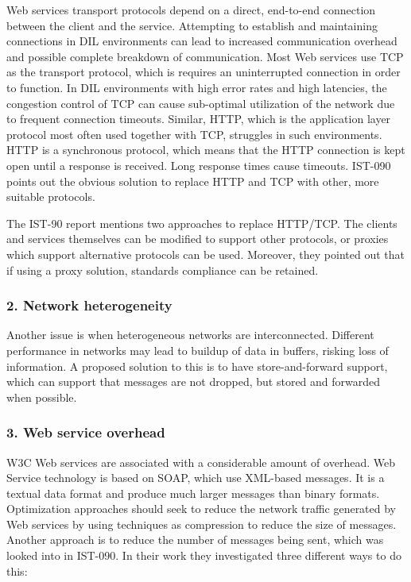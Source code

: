 Web services transport protocols depend on a direct, end-to-end connection
between the client and the service. Attempting to establish and maintaining
connections in DIL environments can lead to increased communication overhead and
possible complete breakdown of communication. Most Web services use TCP as the
transport protocol, which is requires an uninterrupted connection in order to
function. In DIL environments with high error rates and high latencies, the
congestion control of TCP can cause sub-optimal utilization of the network due
to frequent connection timeouts. Similar, HTTP, which is the application layer
protocol most often used together with TCP, struggles in such environments. HTTP
is a synchronous protocol, which means that the HTTP connection is kept open
until a response is received. Long response times cause timeouts. IST-090 points
out the obvious solution to replace HTTP and TCP with other, more suitable
protocols.

The IST-90 report mentions two approaches to replace HTTP/TCP. The clients and
services themselves can be modified to support other protocols, or proxies
which support alternative protocols can be used\cite{ist-090}. Moreover, they
pointed out that if using a proxy solution, standards compliance can be
retained.


\subsubsection{2. Network heterogeneity}

Another issue is when heterogeneous networks are interconnected. Different
performance in networks may lead to buildup of data in buffers, risking loss of
information. A proposed solution to this is to have store-and-forward support,
which can support that messages are not dropped, but stored and forwarded when
possible.


\subsubsection{3. Web service overhead}

W3C Web services are associated with a considerable amount of overhead. Web
Service technology is based on SOAP, which use XML-based messages. It is a
textual data format and produce much larger messages than binary formats.
Optimization approaches should seek to reduce the network traffic generated by
Web services by using techniques as compression to reduce the size of messages.
Another approach is to reduce the number of messages being sent, which was
looked into in IST-090\cite{ist-090}. In their work they investigated three
different ways to do this:

